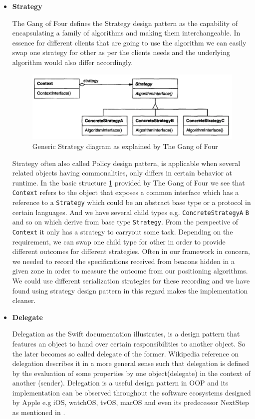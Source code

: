 \begin{itemize}
	\item \textbf{Strategy}
	\par The Gang of Four \cite{gamma1995design} defines the Strategy design pattern as the capability of encapsulating  a family of algorithms and making them interchangeable. In essence for different clients that are going to use the algorithm we can easily swap one strategy for other as per the clients needs and the underlying algorithm would also differ accordingly.
	\begin{figure}[H]
		\centering
		\includegraphics[scale = 0.4]{images/strategy}
		\caption{Generic Strategy diagram as explained by The Gang of Four  \cite{gamma1995design}}
		\label{figure:design_pattern_strategy}
	\end{figure}
	\par Strategy often also called Policy design pattern, is applicable when several related objects having commonalities, only differs in certain behavior at runtime. In the basic structure \ref{figure:design_pattern_strategy} provided by The Gang of Four \cite{gamma1995design} we see that \texttt{Context} refers to the object that exposes a common interface which has a reference to a \texttt{Strategy} which could be an abstract base type or a protocol in certain languages. And we have several child types e.g. \texttt{ConcreteStrategyA} \texttt{B} and so on which derive from base type \texttt{Strategy}. From the perspective of \texttt{Context} it only has a strategy to carryout some task. Depending on the requirement, we can swap one child type for other in order to provide different outcomes for different strategies. Often in our framework in concern, we needed to record the specifications received from beacons hidden in a given zone in order to measure the outcome from our positioning algorithms. We could use different serialization strategies for these recording and we have found using strategy design pattern in this regard makes the implementation cleaner.
	\item \textbf{Delegate}
	\par Delegation as the Swift documentation \cite{swiftdelegation} illustrates, is a design pattern that features an object to hand over certain responsibilities to another object. So the later becomes so called delegate of the former. Wikipedia reference \cite{wikidelegation} on delegation describes it in a more general sense such that delegation is defined by the evaluation of some properties by one object(delegate) in the context of another (sender). Delegation is a useful design pattern in OOP and its implementation can be observed throughout the software ecosystems designed by Apple e.g iOS, watchOS, tvOS, macOS and even its predecessor NextStep as mentioned in \cite{wikidelegation}.

\end{itemize}

